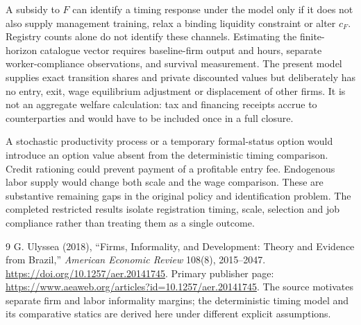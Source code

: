 \documentclass[11pt,a4paper]{article}
\theoremstyle{definition}
\theoremstyle{remark}
\begin{document}
A subsidy to $F$ can identify a timing response under the model only if it does not also supply management training, relax a binding liquidity constraint or alter $c_F$. Registry counts alone do not identify these channels. Estimating the finite-horizon catalogue vector requires baseline-firm output and hours, separate worker-compliance observations, and survival measurement. The present model supplies exact transition shares and private discounted values but deliberately has no entry, exit, wage equilibrium adjustment or displacement of other firms. It is not an aggregate welfare calculation: tax and financing receipts accrue to counterparties and would have to be included once in a full closure.

A stochastic productivity process or a temporary formal-status option would introduce an option value absent from the deterministic timing comparison. Credit rationing could prevent payment of a profitable entry fee. Endogenous labor supply would change both scale and the wage comparison. These are substantive remaining gaps in the original policy and identification problem. The completed restricted results isolate registration timing, scale, selection and job compliance rather than treating them as a single outcome.

\begin{thebibliography}{9}
 G. Ulyssea (2018), ``Firms, Informality, and Development: Theory and Evidence from Brazil,'' \emph{American Economic Review} 108(8), 2015--2047. \url{https://doi.org/10.1257/aer.20141745}. Primary publisher page: \url{https://www.aeaweb.org/articles?id=10.1257/aer.20141745}. The source motivates separate firm and labor informality margins; the deterministic timing model and its comparative statics are derived here under different explicit assumptions.
\end{thebibliography}
\end{document}
